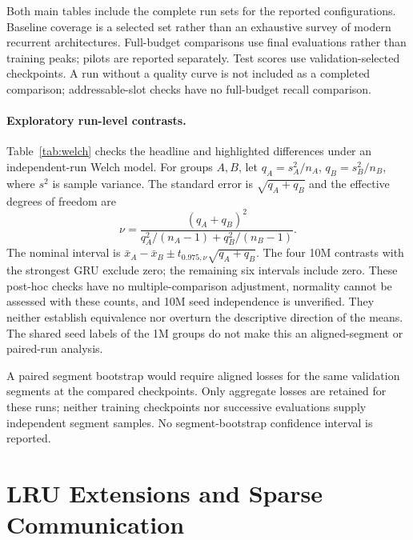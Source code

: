 \documentclass[letterpaper,twoside]{article}
\begin{document}
Both main tables include the complete run sets for the reported configurations. Baseline coverage is a selected set rather than an exhaustive survey of modern recurrent architectures. Full-budget comparisons use final evaluations rather than training peaks; pilots are reported separately. Test scores use validation-selected checkpoints. A run without a quality curve is not included as a completed comparison; addressable-slot checks have no full-budget recall comparison.

\paragraph{Exploratory run-level contrasts.}
Table~\ref{tab:welch} checks the headline and highlighted differences under an independent-run Welch model. For groups $A,B$, let $q_A=s_A^2/n_A$, $q_B=s_B^2/n_B$, where $s^2$ is sample variance. The standard error is $\sqrt{q_A+q_B}$ and the effective degrees of freedom are
\begin{equation}
\nu=\frac{(q_A+q_B)^2}{q_A^2/(n_A-1)+q_B^2/(n_B-1)}.
\end{equation}
The nominal interval is $\bar x_A-\bar x_B\pm t_{0.975,\nu}\sqrt{q_A+q_B}$. The four 10M contrasts with the strongest GRU exclude zero; the remaining six intervals include zero. These post-hoc checks have no multiple-comparison adjustment, normality cannot be assessed with these counts, and 10M seed independence is unverified. They neither establish equivalence nor overturn the descriptive direction of the means. The shared seed labels of the 1M groups do not make this an aligned-segment or paired-run analysis.



A paired segment bootstrap would require aligned losses for the same validation segments at the compared checkpoints. Only aggregate losses are retained for these runs; neither training checkpoints nor successive evaluations supply independent segment samples. No segment-bootstrap confidence interval is reported.

\section{LRU Extensions and Sparse Communication}\label{app:lru}
\end{document}
